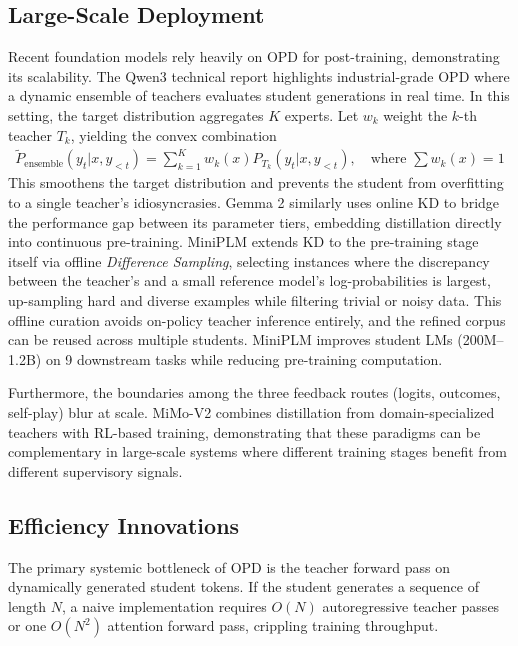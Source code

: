 \documentclass{article} %
\begin{document}
\subsection{Large-Scale Deployment}
Recent foundation models rely heavily on OPD for post-training, demonstrating its scalability. The Qwen3 technical report \citep{2505.09388} highlights industrial-grade OPD where a dynamic ensemble of teachers evaluates student generations in real time. In this setting, the target distribution aggregates $K$ experts. Let $w_k$ weight the $k$-th teacher $T_k$, yielding the convex combination
\begin{align}
\tilde{P}_{\text{ensemble}}(y_t | x, y_{<t}) = \sum_{k=1}^K w_k(x) P_{T_k}(y_t | x, y_{<t}), \quad \text{where } \sum w_k(x) = 1
\end{align}
This smoothens the target distribution and prevents the student from overfitting to a single teacher's idiosyncrasies. Gemma 2 \citep{2408.00118} similarly uses online KD to bridge the performance gap between its parameter tiers, embedding distillation directly into continuous pre-training. MiniPLM \citep{2410.17215} extends KD to the pre-training stage itself via offline \emph{Difference Sampling}, selecting instances where the discrepancy between the teacher's and a small reference model's log-probabilities is largest, up-sampling hard and diverse examples while filtering trivial or noisy data. This offline curation avoids on-policy teacher inference entirely, and the refined corpus can be reused across multiple students. MiniPLM improves student LMs (200M--1.2B) on 9 downstream tasks while reducing pre-training computation.

Furthermore, the boundaries among the three feedback routes (logits, outcomes, self-play) blur at scale. MiMo-V2 \citep{2601.02780} combines distillation from domain-specialized teachers with RL-based training, demonstrating that these paradigms can be complementary in large-scale systems where different training stages benefit from different supervisory signals.

\subsection{Efficiency Innovations}
The primary systemic bottleneck of OPD is the teacher forward pass on dynamically generated student tokens. If the student generates a sequence of length $N$, a naive implementation requires $O(N)$ autoregressive teacher passes or one $O(N^2)$ attention forward pass, crippling training throughput.
\end{document}
